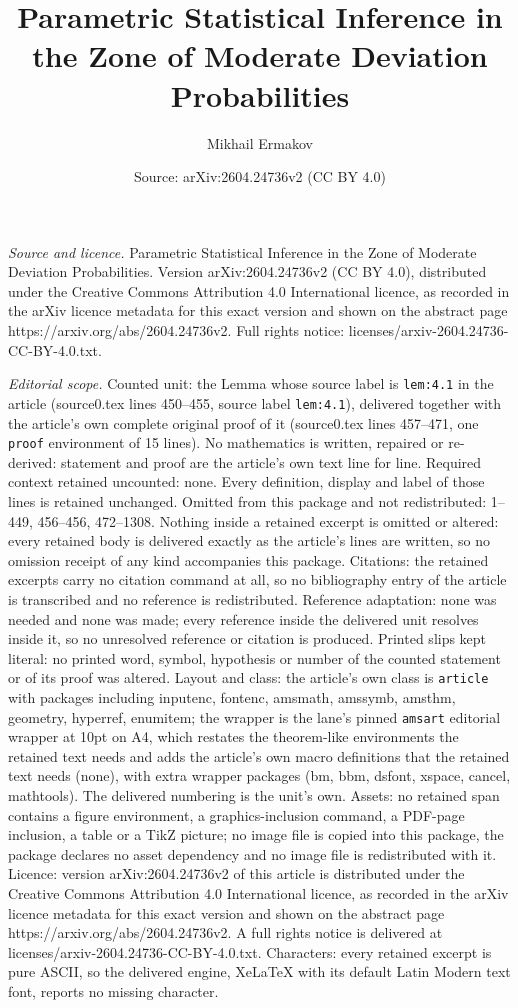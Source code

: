 \documentclass[10pt,a4paper]{amsart}
\title[Parametric Statistical Inference in the Zone of Moderate Dev]{Parametric Statistical Inference in the Zone of Moderate Deviation Probabilities}
\author{Mikhail Ermakov}
\date{Source: arXiv:2604.24736v2 (CC BY 4.0)}
\begin{document}
\maketitle

\noindent\emph{Source and licence.} Parametric Statistical Inference in the Zone of Moderate Deviation Probabilities. Version arXiv:2604.24736v2 (CC BY 4.0), distributed under the Creative Commons Attribution 4.0 International licence, as recorded in the arXiv licence metadata for this exact version and shown on the abstract page https://arxiv.org/abs/2604.24736v2. Full rights notice: licenses/arxiv-2604.24736-CC-BY-4.0.txt.\par\smallskip

\noindent\textit{Editorial scope.} Counted unit: the Lemma whose source label is \texttt{lem:4.1} in the article (source0.tex lines 450--455, source label \texttt{lem:4.1}), delivered together with the article's own complete original proof of it (source0.tex lines 457--471, one \texttt{proof} environment of 15 lines). No mathematics is written, repaired or re-derived: statement and proof are the article's own text line for line. Required context retained uncounted: none. Every definition, display and label of those lines is retained unchanged. Omitted from this package and not redistributed: 1--449, 456--456, 472--1308. Nothing inside a retained excerpt is omitted or altered: every retained body is delivered exactly as the article's lines are written, so no omission receipt of any kind accompanies this package. Citations: the retained excerpts carry no citation command at all, so no bibliography entry of the article is transcribed and no reference is redistributed. Reference adaptation: none was needed and none was made; every reference inside the delivered unit resolves inside it, so no unresolved reference or citation is produced. Printed slips kept literal: no printed word, symbol, hypothesis or number of the counted statement or of its proof was altered. Layout and class: the article's own class is \texttt{article} with packages including inputenc, fontenc, amsmath, amssymb, amsthm, geometry, hyperref, enumitem; the wrapper is the lane's pinned \texttt{amsart} editorial wrapper at 10pt on A4, which restates the theorem-like environments the retained text needs and adds the article's own macro definitions that the retained text needs (none), with extra wrapper packages (bm, bbm, dsfont, xspace, cancel, mathtools). The delivered numbering is the unit's own. Assets: no retained span contains a figure environment, a graphics-inclusion command, a PDF-page inclusion, a table or a TikZ picture; no image file is copied into this package, the package declares no asset dependency and no image file is redistributed with it. Licence: version arXiv:2604.24736v2 of this article is distributed under the Creative Commons Attribution 4.0 International licence, as recorded in the arXiv licence metadata for this exact version and shown on the abstract page https://arxiv.org/abs/2604.24736v2. A full rights notice is delivered at licenses/arxiv-2604.24736-CC-BY-4.0.txt. Characters: every retained excerpt is pure ASCII, so the delivered engine, XeLaTeX with its default Latin Modern text font, reports no missing character.
\end{document}
